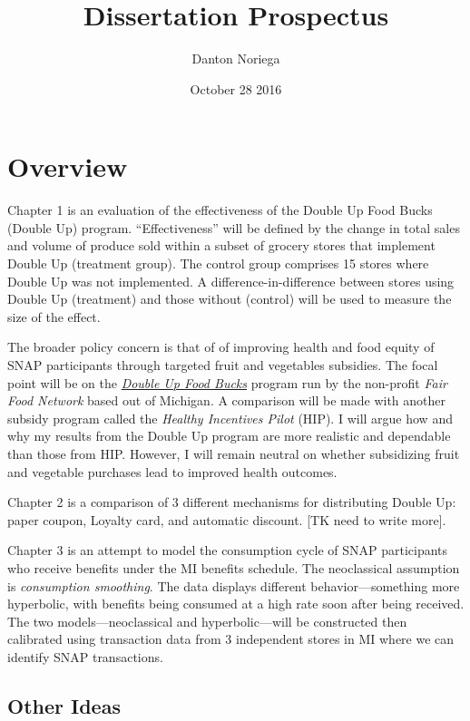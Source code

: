 \documentclass[11pt,letterpaperpaper,]{book}
\title{Dissertation Prospectus}
\author{Danton Noriega}
\date{October 28 2016}
\begin{document}
\maketitle

{
\setcounter{tocdepth}{1}
\tableofcontents
}
\chapter*{Overview}\label{overview}

Chapter 1 is an evaluation of the effectiveness of the Double Up Food
Bucks (Double Up) program. ``Effectiveness'' will be defined by the
change in total sales and volume of produce sold within a subset of
grocery stores that implement Double Up (treatment group). The control
group comprises 15 stores where Double Up was not implemented. A
difference-in-difference between stores using Double Up (treatment) and
those without (control) will be used to measure the size of the effect.

The broader policy concern is that of of improving health and food
equity of SNAP participants through targeted fruit and vegetables
subsidies. The focal point will be on the
\href{http://www.doubleupfoodbucks.org/}{\emph{Double Up Food Bucks}}
program run by the non-profit \emph{Fair Food Network} based out of
Michigan. A comparison will be made with another subsidy program called
the \emph{Healthy Incentives Pilot} (HIP). I will argue how and why my
results from the Double Up program are more realistic and dependable
than those from HIP. However, I will remain neutral on whether
subsidizing fruit and vegetable purchases lead to improved health
outcomes.

Chapter 2 is a comparison of 3 different mechanisms for distributing
Double Up: paper coupon, Loyalty card, and automatic discount. {[}TK
need to write more{]}.

Chapter 3 is an attempt to model the consumption cycle of SNAP
participants who receive benefits under the MI benefits schedule. The
neoclassical assumption is \emph{consumption smoothing}. The data
displays different behavior---something more hyperbolic, with benefits
being consumed at a high rate soon after being received. The two
models---neoclassical and hyperbolic---will be constructed then
calibrated using transaction data from 3 independent stores in MI where
we can identify SNAP transactions.

\section*{Other Ideas}\label{other-ideas}
\end{document}
